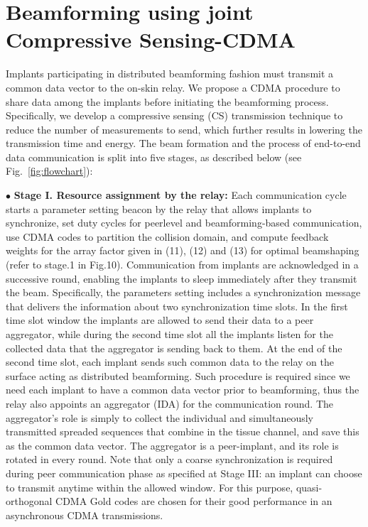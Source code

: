 \section{Beamforming using joint Compressive Sensing-CDMA} 
\label{sec:cs}
Implants participating in distributed beamforming fashion must transmit a common data vector to the on-skin relay. We propose a CDMA procedure to share data among the implants before initiating the beamforming process.
Specifically, we develop a compressive sensing (CS) transmission technique to reduce the number of measurements to send, which further results in lowering the transmission time and energy.	
The beam formation and the process of end-to-end data communication is split into five stages, as described below (see Fig.~\ref{fig:flowchart}):

\noindent $\bullet$ \textbf{Stage I. Resource assignment by the relay:} Each communication cycle starts a parameter setting beacon by the relay that allows implants to synchronize, set duty cycles for peerlevel and beamforming-based communication, use CDMA codes to partition the collision domain, and compute feedback weights for the array factor given in (11), (12) and (13) for optimal beamshaping (refer to stage.1 in Fig.10). Communication from implants are acknowledged in a successive round, enabling the implants to sleep immediately after they transmit the beam. Specifically, the parameters setting includes a synchronization message that delivers the information about two synchronization time slots. In the first time slot window the implants are allowed to send their data to a peer aggregator, while during the second time slot all the implants listen for the collected data that the aggregator is sending back to them. At the end of the second time slot, each implant sends such common data to the relay on the surface acting as distributed beamforming. Such procedure is required since we need each implant to have a common data vector prior to beamforming, thus the relay also appoints an aggregator (IDA) for the communication round. The aggregator’s role is simply to collect the individual and simultaneously transmitted spreaded sequences that combine in the tissue channel, and save this as the common data vector. The aggregator is a peer-implant, and its role is rotated in every round. Note that only a coarse synchronization is required during peer communication phase as specified at Stage III: an implant can choose to transmit anytime within the allowed window. For this purpose, quasi-orthogonal CDMA Gold codes are chosen for their good performance in an asynchronous CDMA transmissions.

